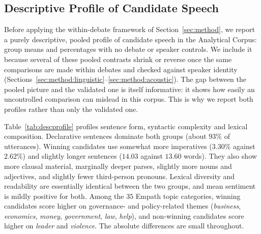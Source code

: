 \documentclass[pdflatex,sn-mathphys-num]{sn-jnl}%
\begin{document}
\subsection{Descriptive Profile of Candidate Speech}
\label{sec:data:descriptive}

Before applying the within-debate framework of Section~\ref{sec:method}, we
report a purely descriptive, pooled profile of candidate speech in the
Analytical Corpus: group means and percentages with no debate or speaker
controls. We include it because several of these pooled contrasts shrink or
reverse once the same comparisons are made within debates and checked
against speaker identity (Sections~\ref{sec:method:linguistic}--\ref{sec:method:acoustic}).
The gap between the pooled picture and the validated one is itself
informative: it shows how easily an uncontrolled comparison can mislead in
this corpus. This is why we report both profiles rather than only the
validated one.

Table~\ref{tab:descprofile} profiles sentence form, syntactic complexity and
lexical composition. Declarative sentences dominate both groups (about
$93\%$ of utterances). Winning candidates use somewhat more imperatives
($3.30\%$ against $2.62\%$) and slightly longer sentences ($14.03$ against
$13.60$ words). They also show more clausal material, marginally deeper
parses, slightly more nouns and adjectives, and slightly fewer third-person
pronouns. Lexical diversity and readability are essentially identical between
the two groups, and mean sentiment is mildly positive for both. Among the
$35$ Empath topic categories, winning candidates score higher on governance-
and policy-related themes (\emph{business}, \emph{economics}, \emph{money},
\emph{government}, \emph{law}, \emph{help}), and non-winning candidates
score higher on \emph{leader} and \emph{violence}. The absolute differences
are small throughout.
\end{document}
